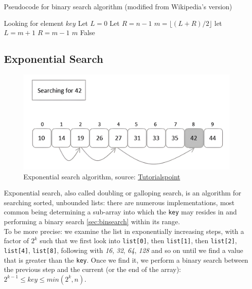 \begin{algorithm}
    \captionsetup{labelsep=newline}
    \caption{Pseudocode for binary search algorithm \label{alg:binsearch} (modified from Wikipedia's version)}
    \begin{algorithmic}[1]
        \State Looking for element $key$
        \State Let $L=0$ 
        \State Let $R=n-1$ 
            \State $m=\lfloor (L+R)/2 \rfloor$
                \State let $L=m+1$
                \State $R = m - 1$
            \Else
                \State \Return $m$ 
            \EndIf
        \EndWhile
        \State \Return False 
    \end{algorithmic}
\end{algorithm}

\subsection{Exponential Search \label{sec:expsearch}}

\begin{figure}[H] 
    \begin{center}
        \includegraphics[width=.8\textwidth]{imgs/exponential_search.png}
        \caption{Exponential search algorithm, source: \href{https://www.tutorialspoint.com/data_structures_algorithms/exponential_search.htm}{Tutorialspoint}\label{fig:expsearch}}
    \end{center}
\end{figure}

Exponential search, also called doubling or galloping search, is an algorithm for searching sorted, unbounded lists: there are numerous implementations, most common being determining a sub-array into which the \verb|key| may resides in and performing a binary search \ref{sec:binsearch} within its range.\\
To be more precise: we examine the list in exponentially increasing steps, with a factor of $2^k$ such that we first look into \verb+list[0]+, then \verb+list[1]+, then \verb+list[2]+, \verb+list[4]+, \verb+list[8]+, following with \textit{16}, \textit{32}, \textit{64}, \textit{128} and so on until we find a value that is greater than the \verb|key|. Once we find it, we perform a binary search between the previous step and the current (or the end of the array): $2^{k-1} \leq key \leq min(2^{k},n)$.

